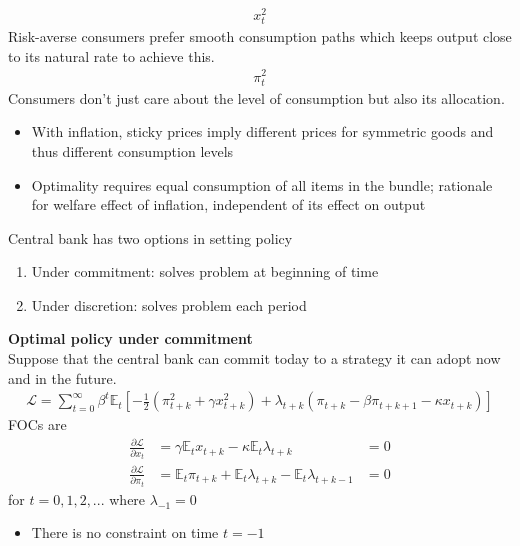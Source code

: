 \documentclass{beamer}
\begin{document}
\begin{frame}
  \begin{align*}
    x_t^2 
  \end{align*}
  Risk-averse consumers prefer smooth consumption paths which keeps output close to its natural rate to achieve this.
  \begin{align*}
    \pi_t^2
  \end{align*}
  Consumers don't just care about the level of consumption but also its allocation. 
  \begin{itemize}
    \item With inflation, sticky prices imply different prices for symmetric goods and thus different consumption levels
    \item Optimality requires equal consumption of all items in the bundle; rationale for welfare effect of inflation, independent of its effect on output
  \end{itemize}
\end{frame}

\begin{frame}
  Central bank has two options in setting policy
  \begin{enumerate}
    \item Under commitment: solves problem at beginning of time
    \item Under discretion: solves problem each period
  \end{enumerate}
\end{frame}

\begin{frame}
  \textbf{Optimal policy under commitment}\\
  Suppose that the central bank can commit today to a strategy it can adopt now and in the future. 
\begin{align}
  \mathcal{L}= \sum_{t=0}^{\infty} \beta^t \mathbb{E}_t \left[ -\frac{1}{2} (\pi_{t+k}^2 + \gamma x_{t+k}^2) + 
  \lambda_{t+k} (\pi_{t+k} - \beta \pi_{t+k+1} - \kappa x_{t+k}) \right] 
\end{align}
FOCs are 
\begin{align}
  \frac{\partial \mathcal{L}}{\partial x_t} &= \gamma \mathbb{E}_t x_{t+k} - \kappa \mathbb{E}_t \lambda_{t+k} &= 0\\
  \frac{\partial \mathcal{L}}{\partial \pi_t} &=\mathbb{E}_t\pi_{t+k} + \mathbb{E}_t\lambda_{t+k} - \mathbb{E}_t \lambda_{t+k-1} &=0
\end{align}
for $t=0,1,2,...$ where $\lambda_{-1}=0$
\begin{itemize}
  \item There is no constraint on time $t=-1$
\end{itemize}
\end{frame}
\end{document}
